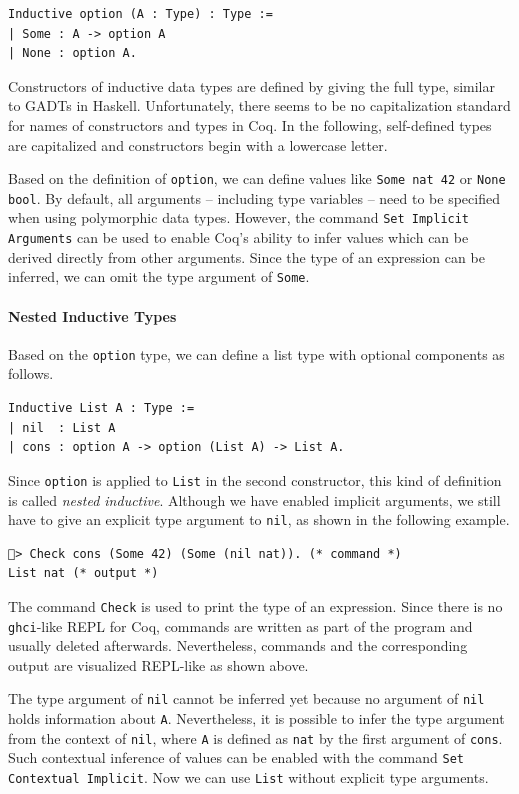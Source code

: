 \documentclass[a4paper, 11pt, fleqn, twoside, abstract=on]{scrreprt}
\newcommand{\hinl}[1]{\texttt{#1}}
\newcommand{\cinl}[1]{\texttt{#1}}
\begin{document}
\begin{verbatim}
Inductive option (A : Type) : Type := 
| Some : A -> option A 
| None : option A.
\end{verbatim}

Constructors of inductive data types are defined by giving the full type, similar to GADTs in Haskell.
Unfortunately, there seems to be no capitalization standard for names of constructors and types in Coq.
In the following, self-defined types are capitalized and constructors begin with a lowercase letter.

Based on the definition of \cinl{option}, we can define values like \cinl{Some nat 42} or \cinl{None bool}.
By default, all arguments -- including type variables -- need to be specified when using polymorphic data types.
However, the command \cinl{Set Implicit Arguments} can be used to enable Coq's ability to infer values which can be derived directly from other arguments.
Since the type of an expression can be inferred, we can omit the type argument of \cinl{Some}.

\paragraph{Nested Inductive Types}
Based on the \cinl{option} type, we can define a list type with optional components as follows.
\begin{verbatim}
Inductive List A : Type :=
| nil  : List A
| cons : option A -> option (List A) -> List A.
\end{verbatim}
\noindent
Since \cinl{option} is applied to \cinl{List} in the second constructor, this kind of definition is called \textit{nested inductive}.
Although we have enabled implicit arguments, we still have to give an explicit type argument to \cinl{nil}, as shown in the following example.

\begin{verbatim}
🐔> Check cons (Some 42) (Some (nil nat)). (* command *)
List nat (* output *)
\end{verbatim}

The command \cinl{Check} is used to print the type of an expression.
Since there is no \hinl{ghci}-like REPL for Coq, commands are written as part of the program and usually deleted afterwards.
Nevertheless, commands and the corresponding output are visualized REPL-like as shown above.

The type argument of \cinl{nil} cannot be inferred yet because no argument of \cinl{nil} holds information about \cinl{A}.
Nevertheless, it is possible to infer the type argument from the context of \cinl{nil}, where \cinl{A} is defined as \cinl{nat} by the first argument of \cinl{cons}.
Such contextual inference of values can be enabled with the command \cinl{Set Contextual Implicit}.
Now we can use \cinl{List} without explicit type arguments.
\end{document}

